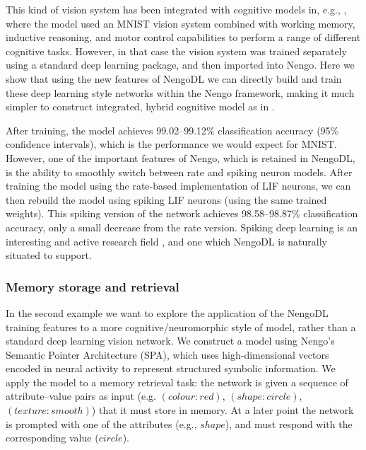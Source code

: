 \documentclass{article}
\begin{document}
This kind of vision system has been integrated with cognitive models in, e.g., \citet{Eliasmith2012a}, where the model used an MNIST vision system combined with working memory, inductive reasoning, and motor control capabilities to perform a range of different cognitive tasks.  However, in that case the vision system was trained separately using a standard deep learning package, and then imported into Nengo.  Here we show that using the new features of NengoDL we can directly build and train these deep learning style networks within the Nengo framework, making it much simpler to construct integrated, hybrid cognitive model as in \citet{Eliasmith2012a}.

After training, the model achieves 99.02--99.12\% classification accuracy (95\% confidence intervals), which is the performance we would expect for MNIST.  However, one of the important features of Nengo, which is retained in NengoDL, is the ability to smoothly switch between rate and spiking neuron models.  After training the model using the rate-based implementation of LIF neurons, we can then rebuild the model using spiking LIF neurons (using the same trained weights).  This spiking version of the network achieves 98.58--98.87\% classification accuracy, only a small decrease from the rate version.  Spiking deep learning is an interesting and active research field \citep{Hunsberger2015,Lee2016}, and one which NengoDL is naturally situated to support.

\subsubsection{Memory storage and retrieval}

In the second example we want to explore the application of the NengoDL training features to a more cognitive/neuromorphic style of model, rather than a standard deep learning vision network.  We construct a model using Nengo's Semantic Pointer Architecture (SPA), which uses high-dimensional vectors encoded in neural activity to represent structured symbolic information.  We apply the model to a memory retrieval task: the network is given a sequence of attribute--value pairs as input (e.g. $(colour: red)$, $(shape: circle)$, $(texture: smooth)$) that it must store in memory.  At a later point the network is prompted with one of the attributes (e.g., $shape$), and must respond with the corresponding value ($circle$).  
\end{document}
